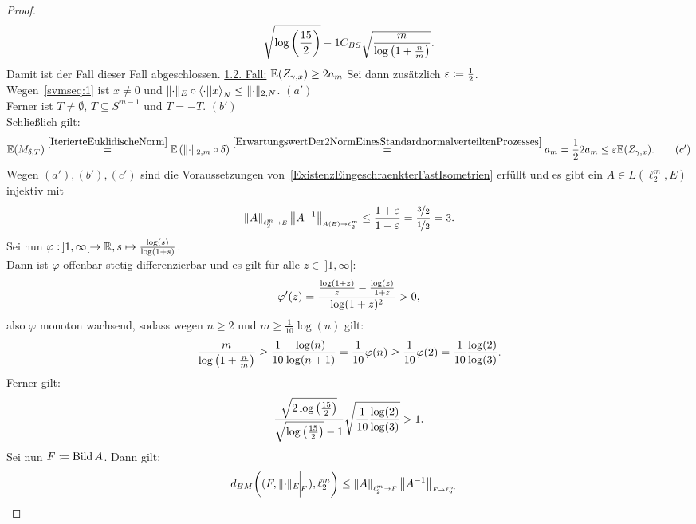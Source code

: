 \begin{proof}
\begin{align*}
{\sqrt{\log\left(\frac {15}2 \right)} - 1}C_{BS}
\sqrt{\frac m {\log\left(1 + \frac {n}m \right)}}\text.
\end{align*}
Damit ist der Fall dieser Fall abgeschlossen.\absatz
\underline{1.2. Fall:} $\mathbb{E}(Z_{\gamma, x}) \ge 2 a_m$\absatz
Sei dann zusätzlich $\varepsilon \coloneqq  \frac 1 2$.\\
Wegen~\eqref{svmseq:1} ist $x \neq 0$ und 
$\lVert\cdot\rVert_E\circ \left\langle \cdot ||x\right\rangle_N \le \lVert\cdot\rVert_{2,N}$. \hfill $(a')$\\
Ferner ist $T\neq \emptyset$, $T \subseteq S^{m-1}$ und $T=-T$. \hfill $(b')$\\
Schließlich gilt:
\begin{align}\mathbb{E}(M_{\delta, T}) \overset{\ref{IterierteEuklidischeNorm}}=
 \mathbb{E}\left(\lVert\cdot\rVert_{2,m} \circ \delta \right)
 \overset{\ref{ErwartungswertDer2NormEinesStandardnormalverteiltenProzesses}}=
 a_m = \frac 1 2 2a_m \le \varepsilon\mathbb{E}(Z_{\gamma,x})\text. \tag{$c'$}
 \end{align}
Wegen $(a'), (b'), (c')$ sind die Voraussetzungen von~\ref{ExistenzEingeschraenkterFastIsometrien} erfüllt und es gibt ein
$A \in L(\ell_2^m, E)$ injektiv mit
\begin{align}
\left\|A\right\|_{\scriptscriptstyle{\ell_2^m \rightarrow E}} \left\|A^{-1}\right\|_{\scriptscriptstyle{A(E) \rightarrow \ell_2^m}} \le
\frac{1+\varepsilon}{1-\varepsilon} = \frac{\nicefrac 3 2}{\nicefrac 1 2} = 3\text.
\label{svmseq:9}
\end{align}
Sei nun $\varphi:\!\ ]1,\infty[\rightarrow\R,s\mapsto\frac{\log(s)}{\log(1+s)}$.\\
Dann ist $\varphi$ offenbar stetig differenzierbar und es gilt für alle
$z\in\!\ ]1,\infty[$:
\[\varphi'(z)=\frac{\frac{\log(1+z)}{z}-\frac{\log(z)}{1+z}}{\log(1+z)^2}>0\text,\]
also $\varphi$ monoton wachsend, sodass wegen $n \ge 2$ und
$m \ge \frac 1{10}\log(n)$ gilt:
\begin{align}\frac m{\log\left(1+\frac n m \right)}
\ge \frac 1 {10}\frac{\log(n)}{\log(n+1)}
= \frac 1 {10}\varphi(n) \ge \frac 1 {10}\varphi(2)
=\frac 1 {10}\frac{\log(2)}{\log(3)}\text. \label{svmseq:10}\end{align}
Ferner gilt:
\begin{align}\frac{\sqrt{2 \log\left(\frac {15}2 \right)}}
{\sqrt{\log\left(\frac {15}2 \right)} - 1}
\sqrt{\frac 1 {10}\frac{\log(2)}{\log(3)}} > 1\text. \label{svmseq:11}
\end{align}
Sei nun $F\coloneqq  \mathop{\textrm{Bild}}\nolimits A$. Dann gilt:
\begin{align*}
d_{BM}\bigg((F, \restrict{\norm\cdot_E}{F}), \ell_2^m \bigg)
&\le \opnorm A {\ell_2^m} F \opnorm{A\inv}{F}{\ell_2^m}

\end{align*}
\end{proof}
